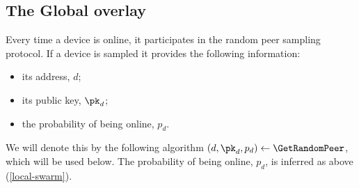\subsection{The Global overlay}
\label{sec:global_overlay}




Every time a device is online, it participates in the random peer sampling 
protocol.
If a device is sampled it provides the following information:
\begin{itemize}
  \item its address, \(d\);
  \item its public key, \(\pk_d\);
  \item the probability of being online, \(p_d\).
\end{itemize}
We will denote this by the following algorithm \((d, \pk_d, p_d)\gets 
  \GetRandomPeer\), which will be used below.
The probability of being online, \(p_d\), is inferred as above 
(\cref{local-swarm}).

